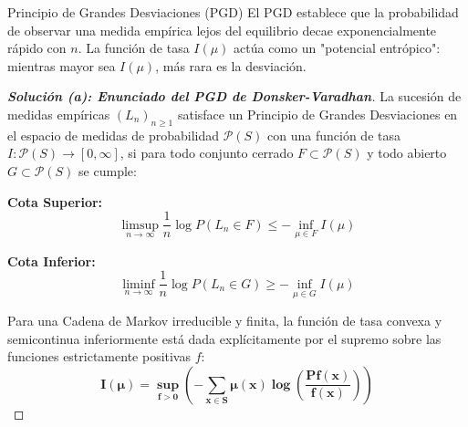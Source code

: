 \documentclass[10pt,a4paper]{article}
\begin{document}
\vspace{2mm}

\begin{nota}{Principio de Grandes Desviaciones (PGD)}
    El PGD establece que la probabilidad de observar una medida empírica lejos del equilibrio decae exponencialmente rápido con $n$. La función de tasa $I(\mu)$ actúa como un "potencial entrópico": mientras mayor sea $I(\mu)$, más rara es la desviación.
\end{nota}

\begin{proof}[\textbf{Solución (a): Enunciado del PGD de Donsker-Varadhan}]
    La sucesión de medidas empíricas $(L_n)_{n \ge 1}$ satisface un Principio de Grandes Desviaciones en el espacio de medidas de probabilidad $\mathcal{P}(S)$ con una función de tasa $I: \mathcal{P}(S) \to [0, \infty]$, si para todo conjunto cerrado $F \subset \mathcal{P}(S)$ y todo abierto $G \subset \mathcal{P}(S)$ se cumple:
    
    \textbf{Cota Superior:}
    \[ \limsup_{n \to \infty} \frac{1}{n} \log P(L_n \in F) \le -\inf_{\mu \in F} I(\mu) \]
    
    \textbf{Cota Inferior:}
    \[ \liminf_{n \to \infty} \frac{1}{n} \log P(L_n \in G) \ge -\inf_{\mu \in G} I(\mu) \]
    
    Para una Cadena de Markov irreducible y finita, la función de tasa convexa y semicontinua inferiormente está dada explícitamente por el supremo sobre las funciones estrictamente positivas $f$:
    \[ \mathbf{I(\mu) = \sup_{f>0} \left( -\sum_{x \in S} \mu(x) \log \left( \frac{Pf(x)}{f(x)} \right) \right)} \]
\end{proof}

\vspace{5mm}
\end{document}
